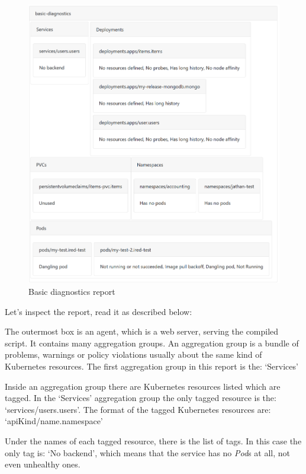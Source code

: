 \begin{figure}[h]
  \centering
  \includegraphics[width=150mm, keepaspectratio]{content/30_caseStudy1/report.png}
  \caption{Basic diagnostics report}
  \label{fig:case_2}
\end{figure}

\clearpage

Let's inspect the report, read it as described below:

The outermost box is an agent, which is a web server, serving the compiled script. It contains many aggregation groups. An aggregation group is a bundle of problems, warnings or policy violations usually about the same kind of Kubernetes resources. The first aggregation group in this report is the: `Services'

Inside an aggregation group there are Kubernetes resources listed which are tagged. In the `Services' aggregation group the only tagged resource is the: `services/users.users'. The format of the tagged Kubernetes resources are: `apiKind/name.namespace'

Under the names of each tagged resource, there is the list of tags. In this case the only tag is: `No backend', which means that the service has no \emph{Pod}s at all, not even unhealthy ones.

